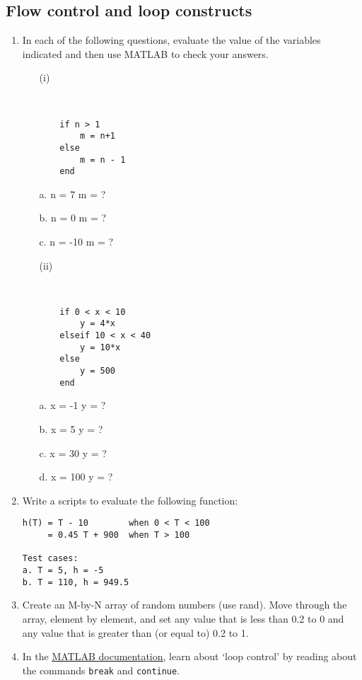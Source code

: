 \documentclass[11pt]{amsart}
\begin{document}
\subsection{Flow control and loop constructs}
\begin{enumerate}
\item In each of the following questions, evaluate the value of the variables indicated and then use MATLAB to check your answers.

	\begin{enumerate}
	\item[(i)] 
	
	\
	
	\color{blue}
	\begin{verbatim}
	if n > 1            
	    m = n+1          
	else                
	    m = n - 1
	end    
	\end{verbatim}
	\color{black}
	
	a. n = 7   m = ?   
	
b. n = 0   m = ?   
          
c. n = -10 m = ?

	\item[(ii)] 
	
	\
	
	\color{blue}
	\begin{verbatim}
	if 0 < x < 10           
		y = 4*x             
	elseif 10 < x < 40      
		y = 10*x             
	else
		y = 500
	end
	\end{verbatim}
	\color{black}
	
a. x = -1   y = ?

b. x = 5    y = ?

c. x = 30   y = ?

d. x = 100  y = ?
	\end{enumerate}
\item Write a scripts to evaluate the following function:
\color{blue}
\begin{verbatim}
h(T) = T - 10        when 0 < T < 100
     = 0.45 T + 900  when T > 100 
        
Test cases:  
a. T = 5, h = -5
b. T = 110, h = 949.5
\end{verbatim}
\color{black}

\item Create an M-by-N array of random numbers (use rand).  Move through the   array, element by element, and set any value that is less than 0.2 to 0 and any   value that is greater than (or equal to) 0.2 to 1. 

\item In the \href{http://uk.mathworks.com/help/matlab/learn_matlab/flow-control.html}{\underline{MATLAB documentation}}, learn about `loop control' by reading about the commands \verb+break+ and \verb+continue+.
\end{enumerate}
\end{document}
